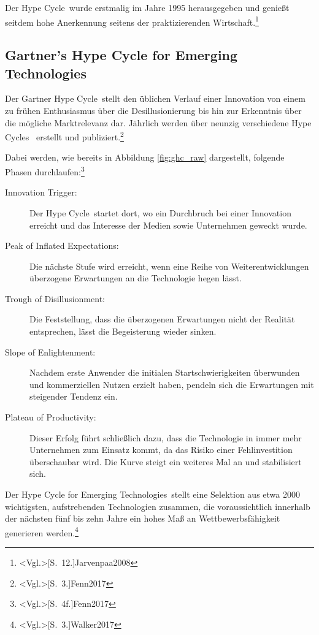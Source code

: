 Der \glqq Hype Cycle\grqq~wurde erstmalig im Jahre 1995 herausgegeben und genießt seitdem hohe Anerkennung seitens der praktizierenden Wirtschaft.\footnote{\citeNP<Vgl.>[S.~12.]{Jarvenpaa2008}}

\subsection{Gartner’s Hype Cycle for Emerging Technologies}
Der \glqq Gartner Hype Cycle\grqq~stellt den üblichen Verlauf einer Innovation von einem zu frühen Enthusiasmus über die Desillusionierung bis hin zur Erkenntnis über die mögliche Marktrelevanz dar. Jährlich werden über neunzig verschiedene \glqq Hype Cycles\grqq~ erstellt und publiziert.\footnote{\citeNP<Vgl.>[S.~3.]{Fenn2017}}

Dabei werden, wie bereits in Abbildung \ref{fig:ghc_raw} dargestellt, folgende Phasen durchlaufen:\footnote{\citeNP<Vgl.>[S.~4f.]{Fenn2017}}
\begin{description}
	\item[Innovation Trigger:] Der \glqq Hype Cycle\grqq~startet dort, wo ein Durchbruch bei einer Innovation erreicht und das Interesse der Medien sowie Unternehmen geweckt wurde.
	\item[Peak of Inflated Expectations:] Die nächste Stufe wird erreicht, wenn eine Reihe von Weiterentwicklungen überzogene Erwartungen an die Technologie hegen lässt.
	\item[Trough of Disillusionment:] Die Feststellung, dass die überzogenen Erwartungen nicht der Realität entsprechen, lässt die Begeisterung wieder sinken.
	\item[Slope of Enlightenment:] Nachdem erste Anwender die initialen Startschwierigkeiten überwunden und kommerziellen Nutzen erzielt haben, pendeln sich die Erwartungen mit steigender Tendenz ein.
	\item[Plateau of Productivity:] Dieser Erfolg führt schließlich dazu, dass die Technologie in immer mehr Unternehmen zum Einsatz kommt, da das Risiko einer Fehlinvestition überschaubar wird. Die Kurve steigt ein weiteres Mal an und stabilisiert sich.
\end{description}

Der \glqq Hype Cycle for Emerging Technologies\grqq~stellt eine Selektion aus etwa 2000 wichtigsten, aufstrebenden Technologien zusammen, die voraussichtlich innerhalb der nächsten fünf bis zehn Jahre ein hohes Maß an Wettbewerbsfähigkeit generieren werden.\footnote{\citeNP<Vgl.>[S.~3.]{Walker2017}}

